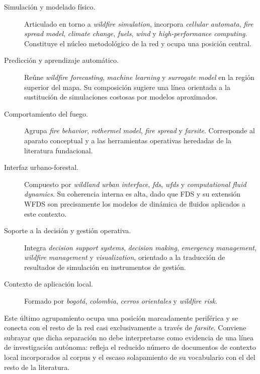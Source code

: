 \begin{description}
  \item[Simulación y modelado físico.] Articulado en torno a
  \emph{wildfire simulation}, incorpora \emph{cellular automata},
  \emph{fire spread model}, \emph{climate change}, \emph{fuels}, \emph{wind} y
  \emph{high-performance computing}. Constituye el núcleo metodológico de la
  red y ocupa una posición central.

  \item[Predicción y aprendizaje automático.] Reúne \emph{wildfire
  forecasting}, \emph{machine learning} y \emph{surrogate model} en la región
  superior del mapa. Su composición sugiere una línea orientada a la
  sustitución de simulaciones costosas por modelos aproximados.

  \item[Comportamiento del fuego.] Agrupa \emph{fire behavior},
  \emph{rothermel model}, \emph{fire spread} y \emph{farsite}. Corresponde al
  aparato conceptual y a las herramientas operativas heredadas de la
  literatura fundacional.

  \item[Interfaz urbano-forestal.] Compuesto por \emph{wildland urban
  interface}, \emph{fds}, \emph{wfds} y \emph{computational fluid dynamics}.
  Su coherencia interna es alta, dado que FDS y su extensión WFDS son
  precisamente los modelos de dinámica de fluidos aplicados a este contexto.

  \item[Soporte a la decisión y gestión operativa.] Integra \emph{decision
  support systems}, \emph{decision making}, \emph{emergency management},
  \emph{wildfire management} y \emph{visualization}, orientado a la
  traducción de resultados de simulación en instrumentos de gestión.

  \item[Contexto de aplicación local.] Formado por \emph{bogotá},
  \emph{colombia}, \emph{cerros orientales} y \emph{wildfire risk}.
\end{description}

Este último agrupamiento ocupa una posición marcadamente periférica y se
conecta con el resto de la red casi exclusivamente a través de \emph{farsite}.
Conviene subrayar que dicha separación no debe interpretarse como evidencia de
una línea de investigación autónoma: refleja el reducido número de documentos
de contexto local incorporados al corpus y el escaso solapamiento de su
vocabulario con el del resto de la literatura.

